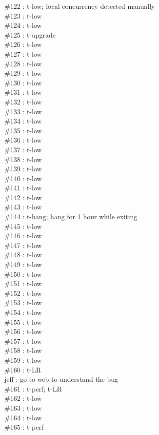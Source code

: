 \#122 : t-low; local concurrency detected manually\\
\#123 : t-low\\
\#124 : t-low\\
\#125 : t-upgrade\\
\#126 : t-low\\
\#127 : t-low\\
\#128 : t-low\\
\#129 : t-low\\
\#130 : t-low\\
\#131 : t-low\\
\#132 : t-low\\
\#133 : t-low\\
\#134 : t-low\\
\#135 : t-low\\
\#136 : t-low\\
\#137 : t-low\\
\#138 : t-low\\
\#139 : t-low\\
\#140 : t-low\\
\#141 : t-low\\
\#142 : t-low\\
\#143 : t-low\\
\#144 : t-hang; hang for 1 hour while exiting\\
\#145 : t-low\\
\#146 : t-low\\
\#147 : t-low\\
\#148 : t-low\\
\#149 : t-low\\
\#150 : t-low\\
\#151 : t-low\\
\#152 : t-low\\
\#153 : t-low\\
\#154 : t-low\\
\#155 : t-low\\
\#156 : t-low\\
\#157 : t-low\\
\#158 : t-low\\
\#159 : t-low\\
\#160 : t-LR\\
jeff : go to web to understand the bug\\
\#161 : t-perf; t-LR\\
\#162 : t-low\\
\#163 : t-low\\
\#164 : t-low\\
\#165 : t-perf\\
